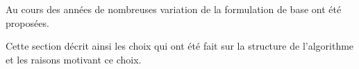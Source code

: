 Au cours des années de nombreuses variation de la formulation de base ont été
proposées.




Cette section décrit ainsi les choix qui ont été fait sur la structure de l’algorithme
et les raisons motivant ce choix.







